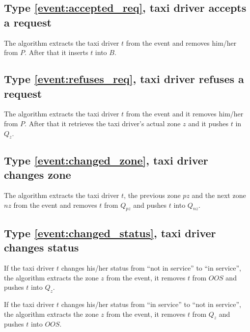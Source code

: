 \subsection{Type \ref{event:accepted_req}, taxi driver accepts a request}
The algorithm extracts the taxi driver $t$ from the event and removes him/her from $P$. After that it inserts $t$ into $B$.

\subsection{Type \ref{event:refuses_req}, taxi driver refuses a request}
The algorithm extracts the taxi driver $t$ from the event and it removes him/her from $P$. After that it retrieves the taxi driver's actual zone $z$ and it pushes $t$ in $Q_z$.

\subsection{Type \ref{event:changed_zone}, taxi driver changes zone}
The algorithm extracts the taxi driver $t$, the previous zone $pz$ and the next zone $nz$ from the event and removes $t$ from $Q_{pz}$ and pushes $t$ into $Q_{nz}$.

\subsection{Type \ref{event:changed_status}, taxi driver changes status}
If the taxi driver $t$ changes his/her status from “not in service” to “in service”, the algorithm extracts the zone $z$ from the event, it removes $t$ from $OOS$ and pushes $t$ into $Q_z$.

If the taxi driver $t$ changes his/her status from “in service” to “not in service”, the algorithm extracts the zone $z$ from the event, it removes $t$ from $Q_z$ and pushes $t$ into $OOS$.
